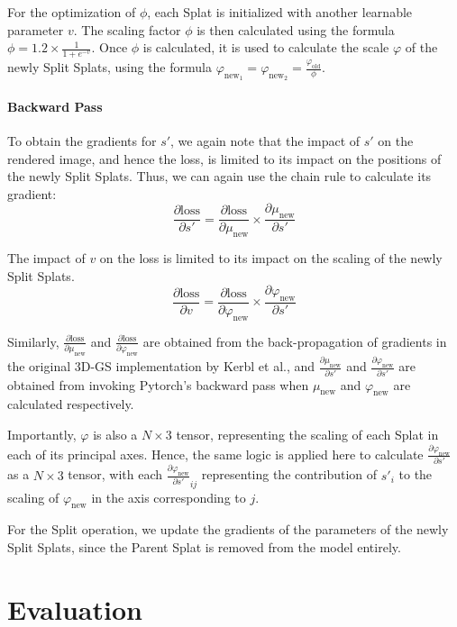 \documentclass[11pt]{report}
\begin{document}
For the optimization of $\phi$, each Splat is initialized with another learnable parameter $v$. The scaling factor $\phi$ is then calculated using the formula $\phi = 1.2 \times \frac{1}{1 + e^{-v}}$. Once $\phi$ is calculated, it is used to calculate the scale $\varphi$ of the newly Split Splats, using the formula $\varphi_{\text{new}_1} =  \varphi_{\text{new}_2} = \frac{\varphi_{\text{old}}}{\phi}$.

\subsubsection{Backward Pass}
To obtain the gradients for $s'$, we again note that the impact of $s'$ on the rendered image, and hence the loss, is limited to its impact on the positions of the newly Split Splats. Thus, we can again use the chain rule to calculate its gradient:
\[ \frac{\partial \text{loss}}{\partial s'} = \frac{\partial \text{loss}}{\partial \mu_{\text{new}}} \times \frac{\partial \mu_{\text{new}}}{\partial s'} \]

The impact of $v$ on the loss is limited to its impact on the scaling of the newly Split Splats.
\[ \frac{\partial \text{loss}}{\partial v} = \frac{\partial \text{loss}}{\partial \varphi_{\text{new}}} \times \frac{\partial \varphi_{\text{new}}}{\partial s'} \]

Similarly, $\frac{\partial \text{loss}}{\partial \mu_{\text{new}}}$ and $\frac{\partial \text{loss}}{\partial \varphi_{\text{new}}}$ are obtained from the back-propagation of gradients in the original 3D-GS implementation by Kerbl et al., and $\frac{\partial \mu_{\text{new}}}{\partial s'}$ and $\frac{\partial \varphi_{\text{new}}}{\partial s'}$ are obtained from invoking Pytorch's backward pass when $\mu_{\text{new}}$ and $\varphi_{\text{new}}$ are calculated respectively.

Importantly, $\varphi$ is also a $N \times 3$ tensor, representing the scaling of each Splat in each of its principal axes. Hence, the same logic is applied here to calculate $\frac{\partial \varphi_{\text{new}}}{\partial s'}$ as a $N \times 3$ tensor, with each $\frac{\partial \varphi_{\text{new}}}{\partial s'}_{ij}$ representing the contribution of $s'_{i}$ to the scaling of $\varphi_{\text{new}}$ in the axis corresponding to $j$.

For the Split operation, we update the gradients of the parameters of the newly Split Splats, since the Parent Splat is removed from the model entirely.

\chapter{Evaluation}
\end{document}
